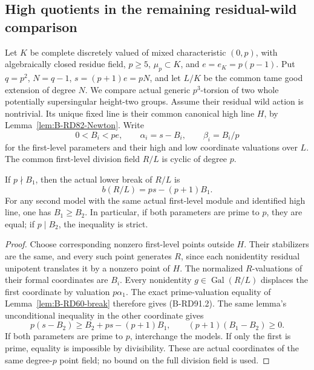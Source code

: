 \subsection{High quotients in the remaining residual-wild comparison}

Let \(K\) be complete discretely valued of mixed characteristic
\((0,p)\), with algebraically closed residue field, \(p\ge5\),
\(\mu_p\subset K\), and \(e=e_K=p(p-1)\). Put
\(q=p^2\), \(N=q-1\), \(s=(p+1)e=pN\), and let
\(L/K\) be the common tame good extension of degree \(N\).
We compare actual generic \(p^3\)-torsion of two whole potentially
supersingular height-two groups. Assume their residual wild action
is nontrivial. Its unique fixed line is their common canonical
high line \(H\), by Lemma~\ref{lem:B-RD82-Newton}. Write
\[
 0<B_i<pe,\qquad \alpha_i=s-B_i,\qquad \beta_i=B_i/p
                                                        \tag{B-RD91.1}
\]
for the first-level parameters and their high and low coordinate
valuations over \(L\). The common first-level division field
\(R/L\) is cyclic of degree \(p\).

\begin{lemma}
\label{lem:B-RD91-first-break}
If \(p\nmid B_1\), then the actual lower break of \(R/L\) is
\[
              b(R/L)=ps-(p+1)B_1.                    \tag{B-RD91.2}
\]
For any second model with the same actual first-level module and
identified high line, one has \(B_1\ge B_2\). In particular,
if both parameters are prime to \(p\), they are equal; if
\(p\mid B_2\), the inequality is strict.
\end{lemma}
\begin{proof}
Choose corresponding nonzero first-level points outside \(H\).
Their stabilizers are the same, and every such point generates
\(R\), since each nonidentity residual unipotent translates it
by a nonzero point of \(H\). The normalized \(R\)-valuations
of their formal coordinates are \(B_i\). Every nonidentity
\(g\in\operatorname{Gal}(R/L)\) displaces the first coordinate
by valuation \(p\alpha_1\). The exact prime-valuation equality
of Lemma~\ref{lem:B-RD60-break} therefore gives (B-RD91.2).
The same lemma's unconditional inequality in the other coordinate
gives
\[
 p(s-B_2)\ge B_2+ps-(p+1)B_1,
 \qquad (p+1)(B_1-B_2)\ge0.                          \tag{B-RD91.3}
\]
If both parameters are prime to \(p\), interchange the models.
If only the first is prime, equality is impossible by divisibility.
These are actual coordinates of the same degree-\(p\) point field;
no bound on the full division field is used.
\end{proof}

